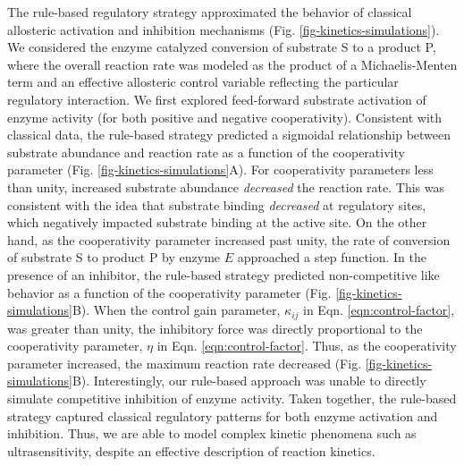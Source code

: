 \documentclass[12pt]{article}
\begin{document}
The rule-based regulatory strategy approximated the behavior of classical allosteric activation and inhibition mechanisms (Fig. \ref{fig-kinetics-simulations}). 
We considered the enzyme catalyzed conversion of substrate S to a product P, where the overall reaction rate was modeled as the product of a Michaelis-Menten term and an effective allosteric control variable reflecting the particular regulatory interaction. 
We first explored feed-forward substrate activation of enzyme activity (for both positive and negative cooperativity). 
Consistent with classical data, the rule-based strategy predicted a sigmoidal relationship between substrate abundance and reaction rate as a function of the cooperativity parameter (Fig. \ref{fig-kinetics-simulations}A). 
For cooperativity parameters less than unity, increased substrate abundance \textit{decreased} the reaction rate. 
This was consistent with the idea that substrate binding \textit{decreased} at regulatory sites, which negatively impacted substrate binding at the active site. 
On the other hand, as the cooperativity parameter increased past unity, the rate of conversion of substrate S to product P by enzyme $E$ approached a step function. 
In the presence of an inhibitor, the rule-based strategy predicted non-competitive like behavior as a function of the cooperativity parameter (Fig. \ref{fig-kinetics-simulations}B). 
When the control gain parameter, $\kappa_{ij}$ in Eqn. \eqref{eqn:control-factor}, was greater than unity, the inhibitory force was directly proportional to the cooperativity parameter, $\eta$ in Eqn. \eqref{eqn:control-factor}. 
Thus, as the cooperativity parameter increased, the maximum reaction rate decreased (Fig. \ref{fig-kinetics-simulations}B). 
Interestingly, our rule-based approach was unable to directly simulate competitive inhibition of enzyme activity. 
Taken together, the rule-based strategy captured classical regulatory patterns for both enzyme activation and inhibition. 
Thus, we are able to model complex kinetic phenomena such as ultrasensitivity, despite an effective description of reaction kinetics. 
    
\end{document}
